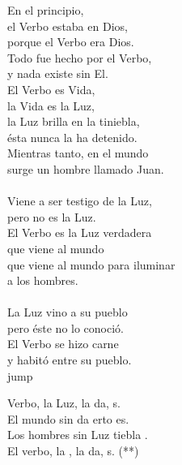 \begin{cancion}%
En el principio,\\
el Verbo estaba en Dios,\\
porque el Verbo era Dios.\\
Todo fue hecho por el Verbo,\\
y nada existe sin El.\\
El Verbo es Vida,\\
la Vida es la Luz,\\
la Luz brilla en la tiniebla,\\
ésta nunca la ha detenido.\\
Mientras tanto, en el mundo\\
surge un hombre llamado Juan.\\
	\jump\\
Viene a ser testigo de la Luz,\\
pero no es la Luz.\\
El Verbo es la Luz verdadera\\
que viene al mundo\\
que viene al mundo para iluminar\\
a los hombres.\\
	\jump\\
La Luz vino a su pueblo\\
pero éste no lo conoció.\\
El Verbo se hizo carne\\
y habitó entre su pueblo.\\jump\\
	\begin{chorus}%
	Verbo, la Luz, la da, s.\\
	El mundo sin da erto es.\\
	Los hombres sin Luz tiebla .\\
	El verbo, la , la da, s. (**)\\
	\end{chorus}%
	\jump\\
\end{cancion}%
